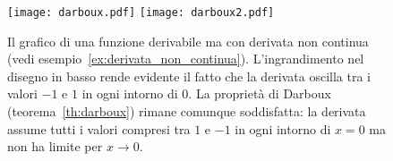 \newsavebox{\qrdarboux}%
\begin{figure}
  \centering\texttt{[image: darboux.pdf]}
  \centering\texttt{[image: darboux2.pdf]}

  \caption{Il grafico di una funzione derivabile ma con 
    derivata non continua (vedi esempio~\ref{ex:derivata_non_continua}).
    L'ingrandimento nel disegno in basso rende evidente 
    il fatto che la derivata oscilla tra i valori 
    $-1$ e $1$ in ogni intorno di $0$.
    La proprietà di Darboux (teorema~\ref{th:darboux})
    rimane comunque soddisfatta: la derivata assume tutti i valori 
    compresi tra $1$ e $-1$ in ogni intorno di $x=0$ ma 
    non ha limite per $x\to 0$.\\\\
    \usebox{\qrdarboux}
}
\end{figure}

